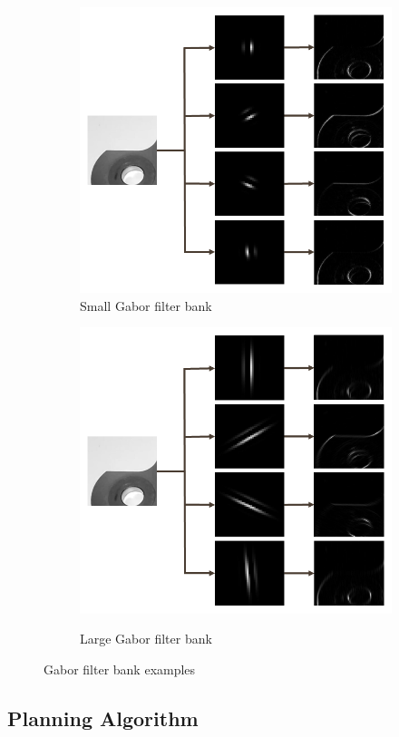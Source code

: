 \documentclass[letterpaper, 10 pt, conference]{ieeeconf}  %
\begin{document}
\begin{figure}
    \centering
    \begin{subfigure}[b]{.49\textwidth}
        \centering
        \includegraphics[width=.65\textwidth]{gabor_filter_small.png}
        \caption{Small Gabor filter bank}
        \vspace*{2mm}
        \label{fig:small gabor}
    \end{subfigure}
    \hfill
    \begin{subfigure}[b]{.49\textwidth}
        \centering
        {\includegraphics[width=.65\textwidth]{gabor_filter_large.png}}
        \caption{Large Gabor filter bank}
        \vspace*{2mm}
        \label{fig:large gabor}
    \end{subfigure}
    \caption{Gabor filter bank examples}
    \label{fig:gabor filter bank}
\end{figure}

\subsection{Planning Algorithm}
\end{document}
